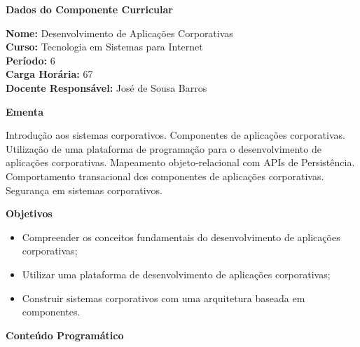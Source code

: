 

\begin{snugshade}\begin{center}\textbf{
	Dados do Componente Curricular
}\end{center}\end{snugshade}

\noindent 	\textbf{Nome:} Desenvolvimento de Aplicações Corporativas
\\ 			\textbf{Curso:} Tecnologia em Sistemas para Internet
\\ 			\textbf{Período:} \unit{6}{\degree}
\\ 			\textbf{Carga Horária:} \unit{67}{\hour}
\\ 			\textbf{Docente Responsável:} José de Sousa Barros 


\begin{snugshade}\begin{center}\textbf{
    Ementa
\vphantom{q}}\end{center}\end{snugshade}

\noindent
Introdução aos sistemas corporativos. Componentes de aplicações corporativas.  Utilização de uma plataforma de programação para o desenvolvimento de aplicações corporativas. Mapeamento objeto-relacional com APIs de Persistência. Comportamento transacional dos componentes de aplicações corporativas. Segurança em sistemas corporativos.



\begin{snugshade}\begin{center}\textbf{
    Objetivos
}\end{center}\end{snugshade}


\begin{itemize}

\item Compreender os conceitos fundamentais do desenvolvimento de aplicações corporativas;
\item Utilizar uma plataforma de desenvolvimento de aplicações corporativas;
\item Construir sistemas corporativos com uma arquitetura baseada em componentes.

\end{itemize}


\begin{snugshade}\begin{center}\textbf{
    Conteúdo Programático
}\end{center}\end{snugshade}

